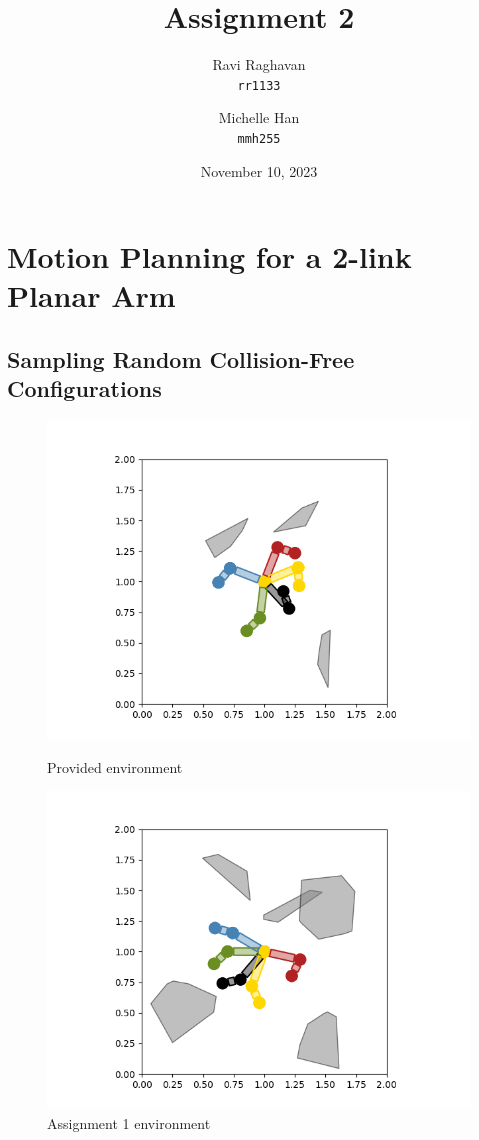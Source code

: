 \documentclass{article}
\title{Assignment 2}
\date{November 10, 2023}
\author{
  Ravi Raghavan\\
  \texttt{rr1133}
  \and
  Michelle Han\\
  \texttt{mmh255}
}
\begin{document}
\maketitle
\section{Motion Planning for a 2-link Planar Arm}
\subsection{Sampling Random Collision-Free Configurations}
\begin{figure}[h!]
     \begin{minipage}{0.48\textwidth}
    \includegraphics[width=\linewidth]{p1.1.1.png}
    \caption{Provided environment}
  \end{minipage}\hfill
  \begin{minipage}{0.48\textwidth}
    \includegraphics[width=\linewidth]{p1.1.2.png}
    \caption{Assignment 1 environment}
  \end{minipage}\hfill
\end{figure}
\end{document}
